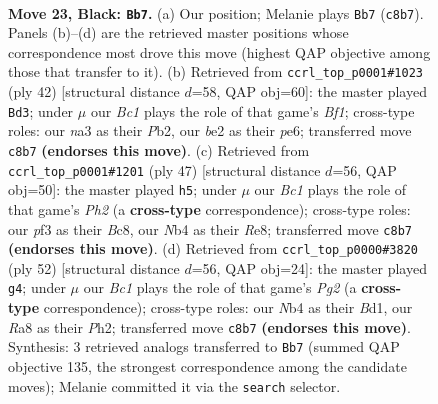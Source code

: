 \documentclass[11pt]{article}
\begin{document}
\clearpage

\begin{figure}[p]\centering
\begin{subfigure}{0.46\textwidth}\centering
\resizebox{\linewidth}{!}{%
\newchessgame
\chessboard[
  setfen={r1b3k1/p1pp4/1p5p/5pp1/1n6/NP3PP1/P1PPBK1P/R7 b - - 5 23},
  showmover=false,
  pgfstyle=straightmove, color=movearrow, markmove={c8-b7}
]}
\caption{}
\end{subfigure}\hfill
\begin{subfigure}{0.46\textwidth}\centering
\resizebox{\linewidth}{!}{%
\newchessgame
\chessboard[
  setfen={r1b5/p4kbp/1p2p1p1/1N2P3/2Pp4/8/PP4PP/4RB1K w - - 2 22},
  showmover=false,
  pgfstyle=straightmove, color=movearrow, markmove={f1-d3}
]}
\caption{}
\end{subfigure}
\\[4pt]
\begin{subfigure}{0.46\textwidth}\centering
\resizebox{\linewidth}{!}{%
\newchessgame
\chessboard[
  setfen={2b1r1k1/1p3p1p/p1p5/6p1/1Pn5/PN2P1PP/5PB1/R5K1 b - - 0 24},
  showmover=false,
  pgfstyle=straightmove, color=movearrow, markmove={h7-h5}
]}
\caption{}
\end{subfigure}\hfill
\begin{subfigure}{0.46\textwidth}\centering
\resizebox{\linewidth}{!}{%
\newchessgame
\chessboard[
  setfen={r4k2/3bpp1p/2p3p1/1p2P3/p4P2/P1R1P3/1P4PP/3B1K2 w - - 1 27},
  showmover=false,
  pgfstyle=straightmove, color=movearrow, markmove={g2-g4}
]}
\caption{}
\end{subfigure}
\caption{\textbf{Move 23, Black: \texttt{Bb7}.} (a) Our position; Melanie plays \texttt{Bb7} (\texttt{c8b7}). Panels (b)--(d) are the retrieved master positions whose correspondence most drove this move (highest QAP objective among those that transfer to it). (b) Retrieved from \texttt{ccrl\_top\_p0001\#1023} (ply 42) [structural distance $d$=58, QAP obj=60]: the master played \texttt{Bd3}; under $\mu$ our \emph{Bc1} plays the role of that game's \emph{Bf1}; cross-type roles: our \emph{n}a3 as their \emph{P}b2, our \emph{b}e2 as their \emph{p}e6; transferred move \texttt{c8b7} \textbf{(endorses this move)}. (c) Retrieved from \texttt{ccrl\_top\_p0001\#1201} (ply 47) [structural distance $d$=56, QAP obj=50]: the master played \texttt{h5}; under $\mu$ our \emph{Bc1} plays the role of that game's \emph{Ph2} (a \textbf{cross-type} correspondence); cross-type roles: our \emph{p}f3 as their \emph{B}c8, our \emph{N}b4 as their \emph{R}e8; transferred move \texttt{c8b7} \textbf{(endorses this move)}. (d) Retrieved from \texttt{ccrl\_top\_p0000\#3820} (ply 52) [structural distance $d$=56, QAP obj=24]: the master played \texttt{g4}; under $\mu$ our \emph{Bc1} plays the role of that game's \emph{Pg2} (a \textbf{cross-type} correspondence); cross-type roles: our \emph{N}b4 as their \emph{B}d1, our \emph{R}a8 as their \emph{P}h2; transferred move \texttt{c8b7} \textbf{(endorses this move)}. Synthesis: 3 retrieved analogs transferred to \texttt{Bb7} (summed QAP objective 135, the strongest correspondence among the candidate moves); Melanie committed it via the \texttt{search} selector.}
\label{fig:thought-m45}
\end{figure}
\end{document}
